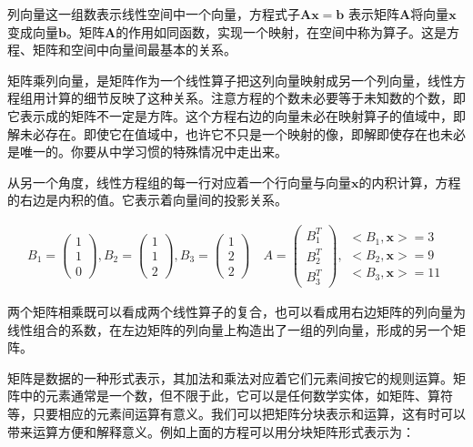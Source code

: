 列向量这一组数表示线性空间中一个向量，方程式子$ \mathbf{ Ax=b } $ 表示矩阵$ \mathbf{A}$将向量$ \mathbf{x}$变成向量$ \mathbf{b}$。矩阵$ \mathbf{A}$的作用如同函数，实现一个映射，在空间中称为算子。这是方程、矩阵和空间中向量间最基本的关系。

矩阵乘列向量，是矩阵作为一个线性算子把这列向量映射成另一个列向量，线性方程组用计算的细节反映了这种关系。注意方程的个数未必要等于未知数的个数，即它表示成的矩阵不一定是方阵。这个方程右边的向量未必在映射算子的值域中，即解未必存在。即使它在值域中，也许它不只是一个映射的像，即解即使存在也未必是唯一的。你要从中学习惯的特殊情况中走出来。

从另一个角度，线性方程组的每一行对应着一个行向量与向量$ \mathbf{x} $的内积计算，方程的右边是内积的值。它表示着向量间的投影关系。

\begin{gather*}
	B_1 = \begin{pmatrix}
		1\\1\\0
	\end{pmatrix},
	B_2 = \begin{pmatrix}
		1\\1\\2
	\end{pmatrix},
	B_3 = \begin{pmatrix}
		1\\2\\2
	\end{pmatrix} \quad
	A = \begin{pmatrix}
		B_1^T\\B_2^T\\B_3^T
	\end{pmatrix},
	\begin{matrix}
		<B_1,\mathbf{x}>=3\\
		<B_2,\mathbf{x}>=9\\
		<B_3,\mathbf{x}>=11
	\end{matrix}
\end{gather*}

两个矩阵相乘既可以看成两个线性算子的复合，也可以看成用右边矩阵的列向量为线性组合的系数，在左边矩阵的列向量上构造出了一组的列向量，形成的另一个矩阵。

矩阵是数据的一种形式表示，其加法和乘法对应着它们元素间按它的规则运算。矩阵中的元素通常是一个数，但不限于此，它可以是任何数学实体，如矩阵、算符等，只要相应的元素间运算有意义。我们可以把矩阵分块表示和运算，这有时可以带来运算方便和解释意义。例如上面的方程可以用分块矩阵形式表示为：

